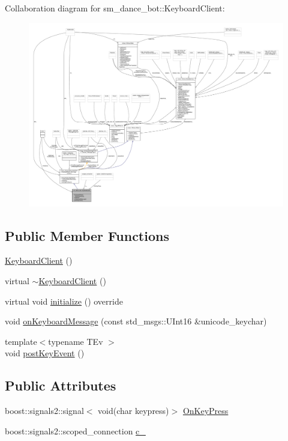 Collaboration diagram for sm\+\_\+dance\+\_\+bot\+:\+:Keyboard\+Client\+:
\nopagebreak
\begin{figure}[H]
\begin{center}
\leavevmode
\includegraphics[width=350pt]{classsm__dance__bot_1_1KeyboardClient__coll__graph}
\end{center}
\end{figure}
\subsection*{Public Member Functions}
\begin{DoxyCompactItemize}
\item 
\hyperlink{classsm__dance__bot_1_1KeyboardClient_a9a747b4b5f22becf0796465d54fe4cdd}{Keyboard\+Client} ()
\item 
virtual \hyperlink{classsm__dance__bot_1_1KeyboardClient_a701e80974260a6fa554537d166838ffe}{$\sim$\+Keyboard\+Client} ()
\item 
virtual void \hyperlink{classsm__dance__bot_1_1KeyboardClient_ad2fd8228e41b257c187ebef2d2a308fd}{initialize} () override
\item 
void \hyperlink{classsm__dance__bot_1_1KeyboardClient_a8018ccce8c7933a1d2034b8b4a60eb5f}{on\+Keyboard\+Message} (const std\+\_\+msgs\+::\+U\+Int16 \&unicode\+\_\+keychar)
\item 
{\footnotesize template$<$typename T\+Ev $>$ }\\void \hyperlink{classsm__dance__bot_1_1KeyboardClient_a6d0d7533977b46e9d913974b02f4cce0}{post\+Key\+Event} ()
\end{DoxyCompactItemize}
\subsection*{Public Attributes}
\begin{DoxyCompactItemize}
\item 
boost\+::signals2\+::signal$<$ void(char keypress)$>$ \hyperlink{classsm__dance__bot_1_1KeyboardClient_aeaf2f85801120bd76adfd6455650dc03}{On\+Key\+Press}
\item 
boost\+::signals2\+::scoped\+\_\+connection \hyperlink{classsm__dance__bot_1_1KeyboardClient_a7d49553efd214743c433e4b1a8c11aee}{c\+\_\+}
\end{DoxyCompactItemize}
